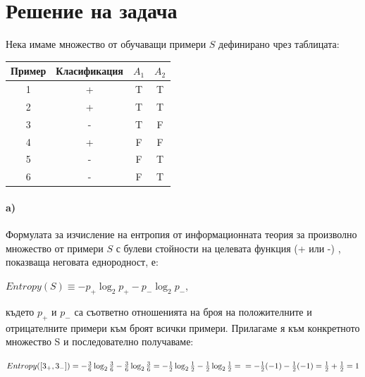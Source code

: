 \documentclass[12pt]{article}
\begin{document}
	
	
	\tableofcontents
	
	
	
	\newpage
	
	\section{Решение на задача }
	
	
	Нека имаме множество от обучаващи примери $S$ дефинирано чрез таблицата:
	\newline
	\begin{table}[h!]
	\centering
		\begin{tabular}{|c|c|c|c|}
			\hline
			Пример & Класификация & $A_{1}$ & $A_{2}$ \\ \hline				1      & +            & T       & T       \\ \hline
			2      & +            & T       & T       \\ \hline
			3      & -            & T       & F       \\ \hline
			4      & +            & F       & F       \\ \hline
			5      & -            & F       & T       \\ \hline
			6      & -            & F       & T       \\ \hline
		\end{tabular}
	\end{table}
	\newline
	
	\paragraph{a)}
	Формулата за изчисление на ентропия от информационната теория за произволно множество от примери $S$ с булеви стойности на целевата функция (+ или -) , показваща неговата еднородност, е:
	
	\begin{center}
		$Entropy(S) \equiv -p_{+}\log_2 p_{+} - p_{-}\log_2 p_{-}$,
	\end{center}
	където $p_{+}$ и $p_{-}$ са съответно отношенията на броя на положителните и отрицателните примери към броят всички примери.\newline\newline
	Прилагаме я към конкретното множество S и последователно получаваме:

	\begin{center}
	$Entropy([3_{+}, 3_{-}]) = -\frac{3}{6}\log_2 \frac{3}{6} - \frac{3}{6}\log_2 \frac{3}{6} = -\frac{1}{2}\log_2 \frac{1}{2} - \frac{1}{2}\log_2 \frac{1}{2} =\newline\newline= -\frac{1}{2}(-1) - \frac{1}{2}(-1) = \frac{1}{2} + \frac{1}{2} = 1$
	\end{center}
\end{document}
